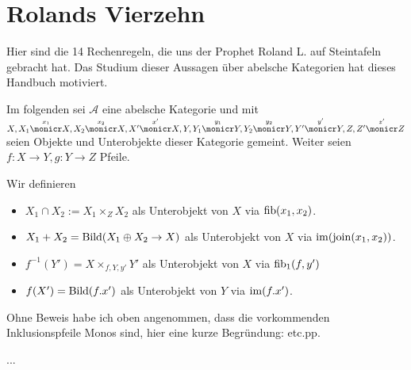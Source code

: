 \section{Rolands Vierzehn}

Hier sind die 14 Rechenregeln, die uns der Prophet Roland L. auf Steintafeln gebracht hat. Das Studium dieser Aussagen über abelsche Kategorien hat dieses Handbuch motiviert.

Im folgenden sei $\mathcal A$ eine abelsche Kategorie und mit $X,
X_1 \overset{x_1}\monicr X,
X_2 \overset{x_2}\monicr X,
X'  \overset{x'}\monicr X,
Y,
Y_1 \overset{y_1}\monicr Y,
Y_2 \overset{y_2}\monicr Y,
Y'  \overset{y'}\monicr Y,
Z,
Z'  \overset{z'}\monicr Z$
seien Objekte und Unterobjekte dieser Kategorie gemeint.
Weiter seien $f:X\to Y, g:Y\to Z$ Pfeile.

\begin{defn}[Objektnotation]
Wir definieren
\begin{itemize}
\item $X_1 \cap X_2 := X_1\times_Z X_2$ als Unterobjekt von $X$ via $\operatorname{fib}(x_1, x_2)$.
\item $X_1+X_2 = \operatorname{Bild}(X_1 \oplus X_2 \to X)$ als Unterobjekt von $X$ via $\operatorname{im}(\operatorname{join}(x_1,x_2))$.
\item $f^{-1}(Y') = X \times_{f,Y,y'} Y'$ als Unterobjekt von $X$ via $\operatorname{fib}_1(f,y')$
\item $f(X') = \operatorname{Bild}(f.x')$ als Unterobjekt von $Y$ via $\operatorname{im}(f.x')$.
\end{itemize}
\end{defn}

\begin{bem}
Ohne Beweis habe ich oben angenommen, dass die vorkommenden Inklusionspfeile Monos sind, hier eine kurze Begründung: etc.pp. %
\end{bem}


\begin{prop}
...
\end{prop}



